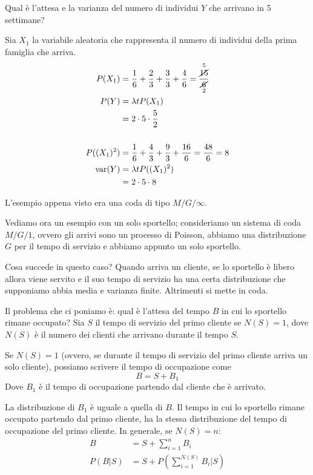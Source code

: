 \documentclass[a4paper,12pt]{book}
\begin{document}
Qual è l'attesa e la varianza del numero di individui $ Y $ che arrivano in 5 settimane?

Sia $ X_1 $ la variabile aleatoria che rappresenta il numero di individui della prima famiglia che arriva. 
\begin{align*}
	P(X_1) & = \frac{1}{6} + \frac{2}{3} + \frac{3}{3} + \frac{4}{6} = \frac{\overset{5}{\cancel{15}}}{\underset{2}{\cancel{\,6\,}}} \\
	P(Y) & = \lambda t P(X_1) \\
	& = 2 \cdot 5 \cdot \frac{5}{2}\\
	\\
	P((X_1)^2) & = \frac{1}{6} + \frac{4}{3} + \frac{9}{3} + \frac{16}{6} = \frac{48}{6} = 8 \\
	\text{var}(Y) & = \lambda t P((X_1)^2) \\
	& = 2\cdot 5 \cdot 8	
\end{align*}

L'esempio appena visto era una coda di tipo $ M/G/\infty $. 

Vediamo ora un esempio con un solo sportello; consideriamo un sistema di coda $ M/G/1 $, ovvero gli arrivi sono un processo di Poisson, abbiamo una distribuzione $ G $ per il tempo di servizio e abbiamo appunto un solo sportello. 

Cosa succede in questo caso? Quando arriva un cliente, se lo sportello è libero allora viene servito e il suo tempo di servizio ha una certa distribuzione che supponiamo abbia media e varianza finite. Altrimenti si mette in coda. 

Il problema che ci poniamo è: qual è l'attesa del tempo $ B $ in cui lo sportello rimane occupato? Sia $ S $ il tempo di servizio del primo cliente se $ N(S) = 1 $, dove $ N(S) $ è il numero dei clienti che arrivano durante il tempo $ S $.

Se $ N(S) = 1 $ (ovvero, se durante il tempo di servizio del primo cliente arriva un solo cliente), possiamo scrivere il tempo di occupazione come
$$ B = S + B_1 $$
Dove $ B_1 $ è il tempo di occupazione partendo dal cliente che è arrivato.

La distribuzione di $ B_1 $ è uguale a quella di $ B $. Il tempo in cui lo sportello rimane occupato partendo dal primo cliente, ha la stessa distribuzione del tempo di occupazione del primo cliente. In generale, se $ N(S) = n $:
\begin{align*}
	B & = S + \sum_{i = 1}^{n} B_i \\
	P(B|S) & = S + P(\sum_{i=1}^{N(S)} B_i | S)
\end{align*}
\end{document}
